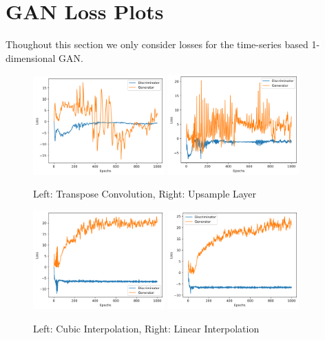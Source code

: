 \graphicspath{{./}{./figures/}{./figures/neural/}}

\chapter{GAN Loss Plots}

Thoughout this section we only consider losses for the time-series based 1-dimensional GAN.
\begin{figure}[t]
\centering
\includegraphics[width=0.45\textwidth]{loss_plots/wpgan_flute_hist_pitch_0729.png}
\includegraphics[width=0.45\textwidth]{loss_plots/wpgan_flute_hist_upsample_pitch_0729.png}
\caption{Left: Transpose Convolution, Right: Upsample Layer}
\end{figure}

\begin{figure}[t]
\centering
\includegraphics[width=0.45\textwidth]{loss_plots/wpgan_flute_hist_cubic_pitch_0729.png}
\includegraphics[width=0.45\textwidth]{loss_plots/wpgan_flute_hist_linear_pitch_0729.png}
\caption{Left: Cubic Interpolation, Right: Linear Interpolation}
\end{figure}

